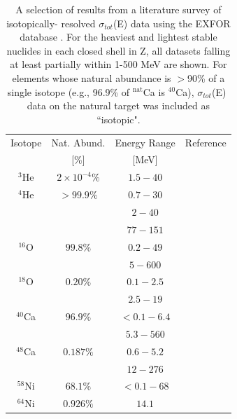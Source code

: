 \documentclass[twocolumn,secnumarabic,amssymb, nobibnotes, aps, prl,
superscriptaddress, nobalancelastpage]{revtex4}
\newcommand{\totEs}{\ensuremath{\sigma_{tot}}(E)\,\,}
\begin{document}
\begin{table}[ht]
    \caption{A selection of results from a literature survey of isotopically-
    resolved \totEs data using the EXFOR database \cite{EXFOR}. For the
    heaviest and lightest stable nuclides in each closed shell in Z, all
    datasets falling at least partially within 1-500 MeV are shown. For elements
    whose natural abundance is $>$90\% of a single isotope (e.g.,
    96.9\% of $^{\text{nat}}$Ca is $^{40}$Ca), \totEs data on the natural
    target was included as ``isotopic".}
    \label{IsotopicCrossSectionTable}
    \begin{center}
        \begin{tabular}{ c c c c }
            \hline
            Isotope & Nat. Abund. & Energy Range & Reference\\
                    & [\%] & [MeV] & \\

            \hline

            $^{3}$He & $2\times 10^{-4}\%$ & $1.5 - 40$ & \cite{Haesner1983}\\
            $^{4}$He & $>99.9\%$ & $0.7-30$ & \cite{Goulding1973}\\
            & & $2-40$ & \cite{Haesner1983}\\
            & & $77-151$ & \cite{Measday1966}\\

            $^{16}$O & $99.8\%$ & $0.2-49$ & \cite{Perey1972}\\
            & & $5-600$ & \cite{Finlay1993}\\

            $^{18}$O & $0.20\%$ & $0.1-2.5$ & \cite{Vaughn1965}\\
            & & $2.5-19$ & \cite{Salisbury1965}\\

            $^{40}$Ca & $96.9\%$ & $<0.1-6.4$ & \cite{Johnson1973}\\
            & & $5.3-560$ & \cite{Abfalterer2001}\\

            $^{48}$Ca & $0.187\%$ & $0.6-5.2$ & \cite{Harvey1985}\\
            & & $12-276$ & \cite{Shane2010}\\

            $^{58}$Ni & $68.1\%$ & $<0.1-68$ & \cite{Perey1993}\\

            $^{64}$Ni & $0.926\%$ & $14.1$ & \cite{Dukarevich1967}\\


\end{tabular}
\end{center}
\end{table}
\end{document}
